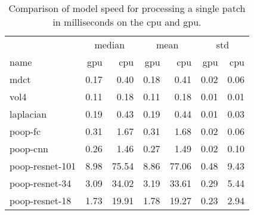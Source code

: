 \begin{table}[ht]
    \centering
    \caption{Comparison of model speed for processing a single patch in milliseconds on the \ac{cpu} and \ac{gpu}.}
    \label{tab:Results:Computation:Speed}
    \begin{tabular}{@{\extracolsep{6pt}}lrrrrrr@{}}
        \hline
        \multicolumn{1}{c}{} & \multicolumn{2}{c}{median} & \multicolumn{2}{c}{mean} & \multicolumn{2}{c}{std} \\
        \cline{2-3}\cline{4-5}\cline{6-7}
        name & \acs{gpu} & \acs{cpu} & \acs{gpu} & \acs{cpu} & \acs{gpu} & \acs{cpu} \\
        \hline
        \acs{mdct}                      & 0.17 &  0.40 & 0.18 &  0.41 & 0.02 & 0.06 \\
        \acs{vol4}                      & 0.11 &  0.18 & 0.11 &  0.18 & 0.01 & 0.01 \\
        \acs{laplacian}                 & 0.19 &  0.43 & 0.19 &  0.44 & 0.01 & 0.03 \\
        \hline
        \acs{poop}-\acs{fc}             & 0.31 &  1.67 & 0.31 &  1.68 & 0.02 & 0.06 \\
        \acs{poop}-\acs{cnn}            & 0.26 &  1.46 & 0.27 &  1.49 & 0.02 & 0.10 \\
        \acs{poop}-\acs{resnet}-101     & 8.98 & 75.54 & 8.86 & 77.06 & 0.48 & 9.43 \\
        \acs{poop}-\acs{resnet}-34      & 3.09 & 34.02 & 3.19 & 33.61 & 0.29 & 5.44 \\
        \acs{poop}-\acs{resnet}-18      & 1.73 & 19.91 & 1.78 & 19.27 & 0.23 & 2.94 \\
    \end{tabular}
\end{table}



